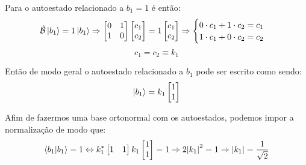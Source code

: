 \begin{example}
        Para o autoestado relacionado a $b_{1}=1$ é então:
            \begin{equation*}
                \hat{\mathcal{B}}\ket{b_{1}} = 1\ket{b_{1}} \Rightarrow 
                \begin{bmatrix}
                    0   &   1   \\
                    1   &   0
                \end{bmatrix}
                \begin{bmatrix}
                    c_{1} \\
                    c_{2}
                \end{bmatrix} = 1
                \begin{bmatrix}
                    c_{1} \\
                    c_{2}
                \end{bmatrix} \Rightarrow 
                \begin{cases}
                    0\cdot c_{1} + 1\cdot c_{2} = c_{1} \\
                    1\cdot c_{1} + 0\cdot c_{2} = c_{2}
                \end{cases}
            \end{equation*}
            \begin{equation*}
                c_{1} = c_{2} \equiv k_{1}
            \end{equation*}
        
        Então de modo geral o autoestado relacionado a $b_{1}$ pode ser escrito como sendo:
            \begin{equation*}
                \ket{b_{1}} = k_{1}
                \begin{bmatrix}
                    1 \\ 1
                \end{bmatrix}
            \end{equation*}
        
        Afim de fazermos uma base ortonormal com os autoestados, podemos impor a normalização de modo que:
            \begin{equation*}
                \braket{b_{1}}{b_{1}} = 1 \Leftrightarrow k_{1}^{\ast}
                \begin{bmatrix}
                    1 & 1
                \end{bmatrix} k_{1}
                \begin{bmatrix}
                    1 \\ 1
                \end{bmatrix} = 1 \Rightarrow 2\abs{k_{1}}^2 = 1 \Rightarrow \abs{k_{1}} = \dfrac{1}{\sqrt{2}}
            \end{equation*} 
        

\end{example}
